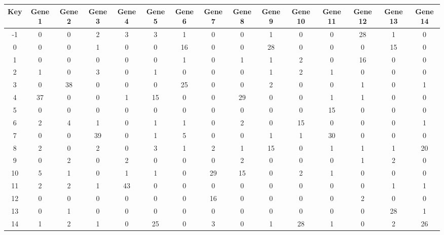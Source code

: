\begin{tabular}{|c|c|c|c|c|c|c|c|c|c|c|c|c|c|c|}
\hline
Key & Gene 1 & Gene 2 & Gene 3 & Gene 4 & Gene 5 & Gene 6 & Gene 7 & Gene 8 & Gene 9 & Gene 10 & Gene 11 & Gene 12 & Gene 13 & Gene 14 \\
\hline
-1 & 0 & 0 & 2 & 3 & 3 & 1 & 0 & 0 & 1 & 0 & 0 & 28 & 1 & 0 \\
0 & 0 & 0 & 1 & 0 & 0 & 16 & 0 & 0 & 28 & 0 & 0 & 0 & 15 & 0 \\
1 & 0 & 0 & 0 & 0 & 0 & 1 & 0 & 1 & 1 & 2 & 0 & 16 & 0 & 0 \\
2 & 1 & 0 & 3 & 0 & 1 & 0 & 0 & 0 & 1 & 2 & 1 & 0 & 0 & 0 \\
3 & 0 & 38 & 0 & 0 & 0 & 25 & 0 & 0 & 2 & 0 & 0 & 1 & 0 & 1 \\
4 & 37 & 0 & 0 & 1 & 15 & 0 & 0 & 29 & 0 & 0 & 1 & 1 & 0 & 0 \\
5 & 0 & 0 & 0 & 0 & 0 & 0 & 0 & 0 & 0 & 0 & 15 & 0 & 0 & 0 \\
6 & 2 & 4 & 1 & 0 & 1 & 1 & 0 & 2 & 0 & 15 & 0 & 0 & 0 & 1 \\
7 & 0 & 0 & 39 & 0 & 1 & 5 & 0 & 0 & 1 & 1 & 30 & 0 & 0 & 0 \\
8 & 2 & 0 & 2 & 0 & 3 & 1 & 2 & 1 & 15 & 0 & 1 & 1 & 1 & 20 \\
9 & 0 & 2 & 0 & 2 & 0 & 0 & 0 & 2 & 0 & 0 & 0 & 1 & 2 & 0 \\
10 & 5 & 1 & 0 & 1 & 1 & 0 & 29 & 15 & 0 & 2 & 1 & 0 & 0 & 0 \\
11 & 2 & 2 & 1 & 43 & 0 & 0 & 0 & 0 & 0 & 0 & 0 & 0 & 1 & 1 \\
12 & 0 & 0 & 0 & 0 & 0 & 0 & 16 & 0 & 0 & 0 & 0 & 2 & 0 & 0 \\
13 & 0 & 1 & 0 & 0 & 0 & 0 & 0 & 0 & 0 & 0 & 0 & 0 & 28 & 1 \\
14 & 1 & 2 & 1 & 0 & 25 & 0 & 3 & 0 & 1 & 28 & 1 & 0 & 2 & 26 \\
\hline
\end{tabular}